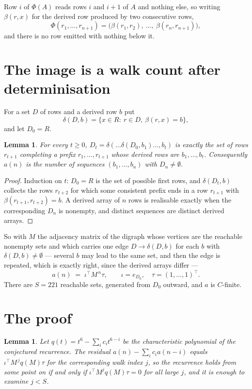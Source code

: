\documentclass[11pt,a4paper]{article}
\theoremstyle{plain}
\newtheorem{lemma}[theorem]{Lemma}
\theoremstyle{definition}
\begin{document}
Row $i$ of $\Phi(A)$ reads rows $i$ and $i+1$ of $A$ and nothing else, so
writing $\beta(r,x)$ for the derived row produced by two consecutive rows,
\[
\Phi(r_1,\dots,r_{n+1})=\bigl(\beta(r_1,r_2),\ \dots,\ \beta(r_n,r_{n+1})\bigr),
\]
and there is no row emitted with nothing below it.

\section{The image is a walk count after determinisation}

For a set $D$ of rows and a derived row $b$ put
\[
\delta(D,b)=\{x\in R:\ r\in D,\ \beta(r,x)=b\},
\]
and let $D_0=R$.

\begin{lemma}\label{lem:det}
For every $t\ge0$, $D_t=\delta(\dots\delta(D_0,b_1)\dots,b_t)$ is exactly the set of rows
$r_{t+1}$ completing a prefix $r_1,\dots,r_{t+1}$ whose derived rows are $b_1,\dots,b_t$.
Consequently $a(n)$ is the number of sequences $(b_1,\dots,b_n)$ with $D_n\neq\emptyset$.
\end{lemma}

\begin{proof}
Induction on $t$: $D_0=R$ is the set of possible first rows, and $\delta(D_t,b)$ collects the
rows $r_{t+2}$ for which some consistent prefix ends in a row $r_{t+1}$ with
$\beta(r_{t+1},r_{t+2})=b$. A derived array of $n$ rows is realisable exactly when the
corresponding $D_n$ is nonempty, and distinct sequences are distinct derived arrays.
\end{proof}

So with $M$ the adjacency matrix of the digraph whose vertices are the reachable nonempty sets
and which carries one edge $D\to\delta(D,b)$ for each $b$ with $\delta(D,b)\neq\emptyset$ ---
several $b$ may lead to the same set, and then the edge is repeated, which is exactly right,
since the derived arrays differ ---
\[
a(n)\;=\;\iota^{\!\top}M^{\,n}\tau,\qquad \iota=e_{D_0},\quad \tau=(1,\dots,1)^{\!\top} .
\]
There are $S=221$ reachable sets, generated from $D_0$ outward, and $a$ is $C$-finite.


\section{The proof}

\begin{lemma}\label{lem:crit}
Let $q(t)=t^{6}-\sum_i c_it^{6-i}$ be the characteristic polynomial of the
conjectured recurrence. The residual $a(n)-\sum_ic_ia(n-i)$ equals
$\iota^{\!\top}M^{\,j}q(M)\tau$ for the corresponding walk index $j$, so the recurrence
holds from some point on if and only if $\iota^{\!\top}M^{j}q(M)\tau=0$ for all large $j$,
and it is enough to examine $j<S$.
\end{lemma}
\end{document}
